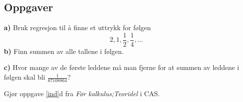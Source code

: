 

\usepackage{xr}


\subsection*{Oppgaver}
\textbf{a)} Bruk regresjon til å finne et uttrykk for følgen
\[ 2, 1, \frac{1}{2}, \frac{1}{4}, ... \]
\textbf{b)} Finn summen av alle tallene i følgen. 

\textbf{c)} Hvor mange av de første leddene må man fjerne for at summen av leddene i følgen skal bli $ \frac{1}{67108864}$?

 Gjør oppgave \ref{ind}d fra \textit{Før kalkulus;Teoridel} i CAS.

